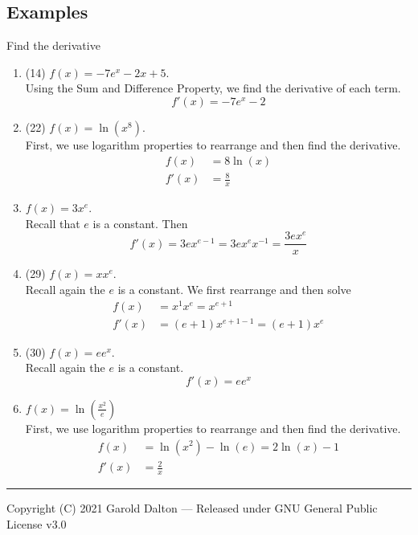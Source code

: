 \documentclass[14pt]{extarticle}
\begin{document}
\subsection{Examples}
Find the derivative
\begin{enumerate}
	\item (14) $f(x)= -7e^x - 2x+5$. \\
	Using the Sum and Difference Property, we find the derivative of each term.\\
	$$f'(x) = -7e^x -2$$
	
	\item (22) $f(x) = \ln(x^8)$. \\
	First, we use logarithm properties to rearrange and then find the derivative. \\
	\begin{align*}
		f(x) &= 8\ln(x) \\
		f'(x) &= \frac{8}{x}
	\end{align*}

	\item $f(x) = 3x^e$. \\
	Recall that $e$ is a constant. Then $$f'(x) = 3ex^{e-1}=3ex^ex^{-1} = \frac{3ex^e}{x}$$
	
	\item (29) $f(x) = xx^e$. \\
	Recall again the $e$ is a constant. We first rearrange and then solve
	\begin{align*}
		f(x) &= x^1x^e = x^{e+1} \\
		f'(x) &= (e+1)x^{e+1-1} = (e+1)x^e
	\end{align*}
	
	\item (30) $f(x) = ee^x$. \\
	Recall again the $e$ is a constant. $$f'(x)= ee^x$$
	
	\item $f(x) = \ln\left(\frac{x^2}{e}\right)$\\
	First, we use logarithm properties to rearrange and then find the derivative. \\
	\begin{align*}
		f(x) &= \ln(x^2) - \ln(e) = 2\ln(x) - 1 \\
		f'(x) &= \frac{2}{x}
	\end{align*}
\end{enumerate}


\noindent\rule{\textwidth}{1pt}
{\footnotesize Copyright (C) 2021 Garold Dalton --- Released under GNU General Public License v3.0}


\cleardoublepage
\end{document}
